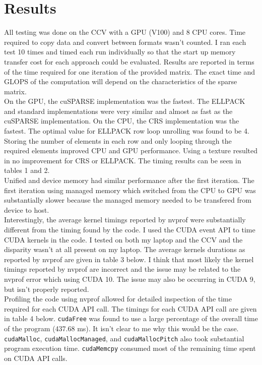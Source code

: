 \documentclass{article} \usepackage[utf8]{inputenc} \usepackage{amsmath}
\begin{document}
\section{Results}

All testing was done on the CCV with a GPU (V100) and 8 CPU cores.  Time
required to copy data and convert between formats wasn't counted. I ran each
test 10 times and timed each run individually so that the start up memory
transfer cost for each approach could be evaluated.  Results are reported in
terms of the time required for one iteration of the provided matrix.  The exact
time and GLOPS of the computation will depend on the characteristics of the
sparse matrix. \\

On the GPU, the cuSPARSE implementation was the fastest.  The ELLPACK and
standard implementations were very similar and almost as fast as the cuSPARSE
implementation. On the CPU, the CRS implementation was the fastest. The optimal
value for ELLPACK row loop unrolling was found to be 4.  Storing the number of
elements in each row and only looping through the required elements improved
CPU and GPU performance.  Using a texture resulted in no improvement for CRS or
ELLPACK.  The timing results can be seen in tables 1 and 2. \\

Unified and device memory had similar performance after the first iteration.
The first iteration using managed memory which switched from the CPU to GPU was
substantially slower because the managed memory needed to be transfered from
device to host. \\

Interestingly, the average kernel timings reported by nvprof were substantially
different from the timing found by the code. I used the CUDA event API to time
CUDA kernels in the code. I tested on both my laptop and the CCV and the
disparity wasn't at all present on my laptop. The average kernels durations as
reported by nvprof are given in table 3 below. I think that most likely the
kernel timings reported by nvprof are incorrect and the issue may be related to
the nvprof error which using CUDA 10. The issue may also be occurring in CUDA
9, but isn't properly reported.  \\ 

Profiling the code using nvprof allowed for detailed inspection of the time
required for each CUDA API call. The timings for each CUDA API call are given
in table 4 below. \texttt{cudaFree} was found to use a large percentage of the
overall time of the program (437.68 ms). It isn't clear to me why this would be
the case. \texttt{cudaMalloc}, \texttt{cudaMallocManaged}, and
\texttt{cudaMallocPitch} also took substantial program execution time.
\texttt{cudaMemcpy} consumed most of the remaining time spent on CUDA API
calls. \\
\end{document}
